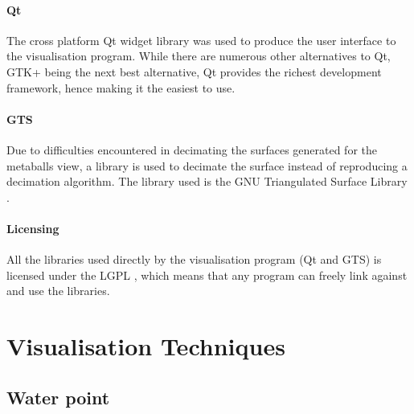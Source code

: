 
\paragraph{Qt}

The cross platform Qt widget library \citep{Qt} was used to produce the user
interface to the visualisation program. While there are numerous other
alternatives to Qt, GTK+ being the next best alternative, Qt provides the
richest development framework, hence making it the easiest to use.


\paragraph{GTS}

Due to difficulties encountered in decimating the surfaces generated for the
metaballs view, a library is used to decimate the surface instead of
reproducing a decimation algorithm. The library used is the GNU Triangulated
Surface Library \citep{GTS}.


\paragraph{Licensing}

All the libraries used directly by the visualisation program (Qt and GTS) is
licensed under the LGPL \citep{LGPL}, which means that any program can freely
link against and use the libraries.



\section{Visualisation Techniques}
\label{sec:implementation_techniques}


\subsection{Water point}
\label{sub:implementation_point}

